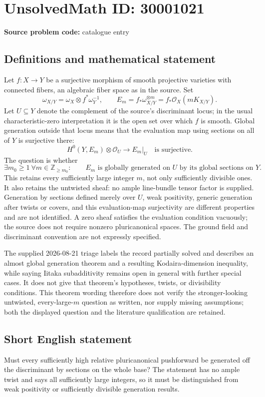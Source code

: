 \documentclass[11pt]{article}
\newcommand{\Z}{\mathbb{Z}}
\begin{document}
\section*{UnsolvedMath ID: 30001021}
\textbf{Source problem code:} catalogue entry
\subsection{Definitions and mathematical statement}
Let $f:X\to Y$ be a surjective morphism of smooth projective varieties with connected fibers, an algebraic fiber space as in the source. Set \[\omega_{X/Y}=\omega_X\otimes f^*\omega_Y^{-1},\qquad E_m=f_*\omega_{X/Y}^{\otimes m}=f_*\mathcal O_X(mK_{X/Y}).\] Let $U\subseteq Y$ denote the complement of the source's discriminant locus; in the usual characteristic-zero interpretation it is the open set over which $f$ is smooth. Global generation outside that locus means that the evaluation map using sections on all of $Y$ is surjective there: \[H^0(Y,E_m)\otimes\mathcal O_U\longrightarrow E_m|_U\quad\text{is surjective}.\] The question is whether \[\exists m_0\geq1\ \forall m\in\Z_{\geq m_0}:\qquad E_m\text{ is globally generated on }U\text{ by its global sections on }Y.\] This retains every sufficiently large integer $m$, not only sufficiently divisible ones. It also retains the untwisted sheaf: no ample line-bundle tensor factor is supplied. Generation by sections defined merely over $U$, weak positivity, generic generation after twists or covers, and this evaluation-map surjectivity are different properties and are not identified. A zero sheaf satisfies the evaluation condition vacuously; the source does not require nonzero pluricanonical spaces. The ground field and discriminant convention are not expressly specified.\par The supplied 2026-08-21 triage labels the record partially solved and describes an almost global generation theorem and a resulting Kodaira-dimension inequality, while saying Iitaka subadditivity remains open in general with further special cases. It does not give that theorem's hypotheses, twists, or divisibility conditions. This theorem wording therefore does not verify the stronger-looking untwisted, every-large-$m$ question as written, nor supply missing assumptions; both the displayed question and the literature qualification are retained.
\subsection{Short English statement}
Must every sufficiently high relative pluricanonical pushforward be generated off the discriminant by sections on the whole base? The statement has no ample twist and says all sufficiently large integers, so it must be distinguished from weak positivity or sufficiently divisible generation results.
\end{document}
